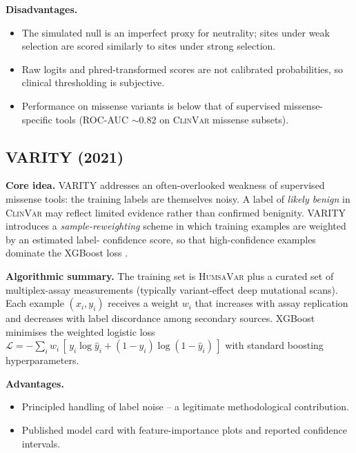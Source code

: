 \documentclass[11pt,a4paper,oneside]{report}
\begin{document}
\textbf{Disadvantages.}
\begin{itemize}[leftmargin=2em, itemsep=0.15em]
  \item The simulated null is an imperfect proxy for
    neutrality; sites under weak selection are scored
    similarly to sites under strong selection.
  \item Raw logits and phred-transformed scores are not
    calibrated probabilities, so clinical thresholding
    is subjective.
  \item Performance on missense variants is below that
    of supervised missense-specific tools (ROC-AUC
    $\sim 0.82$ on \textsc{ClinVar} missense subsets).
\end{itemize}

\subsection{VARITY (2021) \texorpdfstring{\citep{wu2021varity}}{(Wu et al., 2021)}}
\label{sec:rw-varity}

\textbf{Core idea.} VARITY addresses an often-overlooked
weakness of supervised missense tools: the training
labels are themselves noisy. A label of \emph{likely
benign} in \textsc{ClinVar} may reflect limited
evidence rather than confirmed benignity. VARITY
introduces a \emph{sample-reweighting} scheme in which
training examples are weighted by an estimated label-
confidence score, so that high-confidence examples
dominate the XGBoost loss
\citep{wu2021varity}.

\textbf{Algorithmic summary.} The training set is
\textsc{HumsaVar} plus a curated set of multiplex-assay
measurements (typically variant-effect deep mutational
scans). Each example $(x_i, y_i)$ receives a weight
$w_i$ that increases with assay replication and decreases
with label discordance among secondary sources. XGBoost
minimises the weighted logistic loss
$\mathcal{L} = -\sum_i w_i\, [\, y_i \log \hat{y}_i +
(1 - y_i)\log(1 - \hat{y}_i)\,]$ with standard
boosting hyperparameters.

\textbf{Advantages.}
\begin{itemize}[leftmargin=2em, itemsep=0.15em]
  \item Principled handling of label noise -- a legitimate
    methodological contribution.
  \item Published model card with feature-importance plots
    and reported confidence intervals.
\end{itemize}
\end{document}
